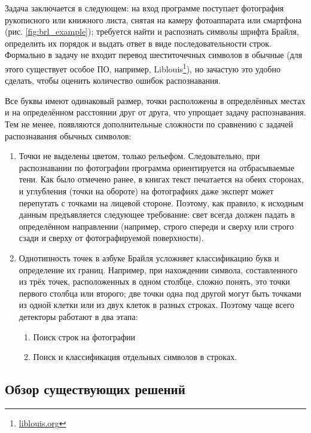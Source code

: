 \documentclass{main.tex}[subfiles]
\begin{document}
Задача заключается в следующем: на вход программе поступает фотография рукописного или книжного листа, снятая на камеру фотоаппарата или смартфона (рис. \ref{fig:brl_example}); требуется найти и распознать символы шрифта Брайля, определить их порядок и выдать ответ в виде последовательности строк.
Формально в задачу не входит перевод шеститочечных символов в обычные (для этого существует особое ПО, например, Liblouis\footnote{\href{http://liblouis.org/}{liblouis.org}}), но зачастую это удобно сделать, чтобы оценить количество ошибок распознавания.

Все буквы имеют одинаковый размер, точки расположены в определённых местах и на определённом расстоянии друг от друга, что упрощает задачу распознавания.
Тем не менее, появляются дополнительные сложности по сравнению с задачей распознавания обычных символов:

\begin{enumerate}[noitemsep]
    \item Точки не выделены цветом, только рельефом.
    Следовательно, при распознавании по фотографии программа ориентируется на отбрасываемые тени.
    Как было отмечено ранее, в книгах текст печатается на обеих сторонах, и углубления (точки на обороте) на фотографиях даже эксперт может перепутать с точками на лицевой стороне.
    Поэтому, как правило, к исходным данным предъявляется следующее требование: свет всегда должен падать в определённом направлении (например, строго спереди и сверху или строго сзади и сверху от фотографируемой поверхности).
    \item Однотипность точек в азбуке Брайля усложняет классификацию букв и определение их границ.
    Например, при нахождении символа, составленного из трёх точек, расположенных в одном столбце, сложно понять, это точки первого столбца или второго; две точки одна под другой могут быть точками из одной клетки или из двух клеток в разных строках.
    Поэтому чаще всего детекторы работают в два этапа:
    \begin{enumerate}[noitemsep]
        \item Поиск строк на фотографии
        \item Поиск и классификация отдельных символов в строках.
    \end{enumerate}
\end{enumerate}

\subsection{Обзор существующих решений}
\end{document}
